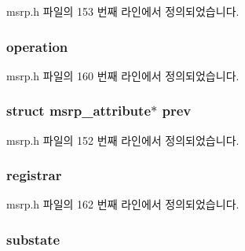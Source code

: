 msrp.\+h 파일의 153 번째 라인에서 정의되었습니다.

\subsubsection[{\texorpdfstring{operation}{operation}}]{ operation}\hypertarget{structmsrp__attribute_a2aadabc5648d67e2327e5503c3d3dce5}{}\label{structmsrp__attribute_a2aadabc5648d67e2327e5503c3d3dce5}


msrp.\+h 파일의 160 번째 라인에서 정의되었습니다.

\subsubsection[{\texorpdfstring{prev}{prev}}]{\setlength{\rightskip}{0pt plus 5cm}struct {\bf msrp\+\_\+attribute}$\ast$ prev}\hypertarget{structmsrp__attribute_a49481293ca3184e69bb9c85ed2888147}{}\label{structmsrp__attribute_a49481293ca3184e69bb9c85ed2888147}


msrp.\+h 파일의 152 번째 라인에서 정의되었습니다.

\subsubsection[{\texorpdfstring{registrar}{registrar}}]{ registrar}\hypertarget{structmsrp__attribute_a9e893db6ef01e9cda330159f5d3ee764}{}\label{structmsrp__attribute_a9e893db6ef01e9cda330159f5d3ee764}


msrp.\+h 파일의 162 번째 라인에서 정의되었습니다.

\subsubsection[{\texorpdfstring{substate}{substate}}]{ substate}\hypertarget{structmsrp__attribute_a77fc98efbb49dcae027e0dde935b7070}{}\label{structmsrp__attribute_a77fc98efbb49dcae027e0dde935b7070}



